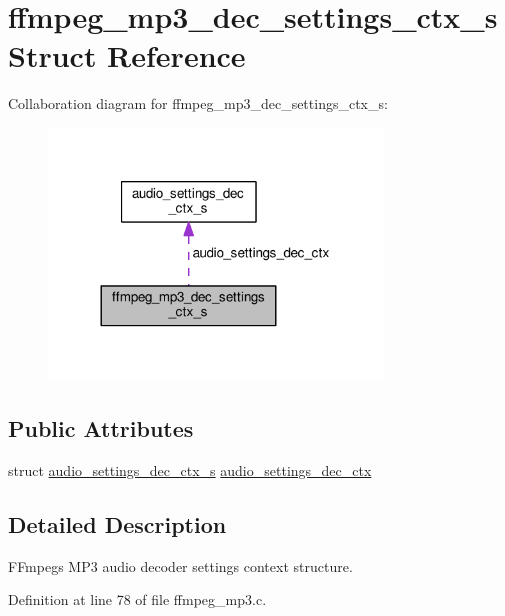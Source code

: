 \hypertarget{structffmpeg__mp3__dec__settings__ctx__s}{}\section{ffmpeg\+\_\+mp3\+\_\+dec\+\_\+settings\+\_\+ctx\+\_\+s Struct Reference}
\label{structffmpeg__mp3__dec__settings__ctx__s}


Collaboration diagram for ffmpeg\+\_\+mp3\+\_\+dec\+\_\+settings\+\_\+ctx\+\_\+s\+:\nopagebreak
\begin{figure}[H]
\begin{center}
\leavevmode
\includegraphics[width=252pt]{structffmpeg__mp3__dec__settings__ctx__s__coll__graph}
\end{center}
\end{figure}
\subsection*{Public Attributes}
\begin{DoxyCompactItemize}
\item 
struct \hyperlink{structaudio__settings__dec__ctx__s}{audio\+\_\+settings\+\_\+dec\+\_\+ctx\+\_\+s} \hyperlink{structffmpeg__mp3__dec__settings__ctx__s_a7d85d6a96ffe6563fe7f3083c389699f}{audio\+\_\+settings\+\_\+dec\+\_\+ctx}
\end{DoxyCompactItemize}


\subsection{Detailed Description}
F\+Fmpeg\textquotesingle{}s M\+P3 audio decoder settings context structure. 

Definition at line 78 of file ffmpeg\+\_\+mp3.\+c.



